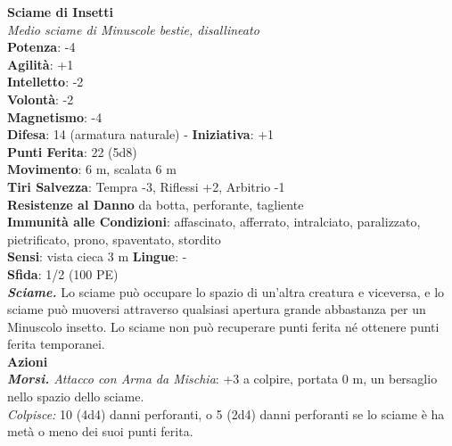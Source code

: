 \begin{multicols}{2}
\medskip\textbf{Sciame di Insetti}\\
\emph{Medio sciame di Minuscole bestie, disallineato}\\
\textbf{Potenza}: -4\\
\textbf{Agilità}: +1\\
\textbf{Intelletto}: -2\\
\textbf{Volontà}: -2\\
\textbf{Magnetismo}: -4\\
\textbf{Difesa}: 14 (armatura naturale) - \textbf{Iniziativa}: +1\\
\textbf{Punti Ferita}: 22 (5d8)\\
\textbf{Movimento}: 6 m, scalata 6 m\\
\textbf{Tiri Salvezza}: Tempra -3, Riflessi +2, Arbitrio -1\\
\textbf{Resistenze al Danno} da botta, perforante, tagliente\\
\textbf{Immunità alle Condizioni}: affascinato, afferrato, intralciato, paralizzato, pietrificato, prono, spaventato, stordito\\
\textbf{Sensi}: vista cieca 3 m
\textbf{Lingue}: -\\
\textbf{Sfida}: 1/2 (100 PE)\smallskip\\
\emph{\textbf{Sciame.}} Lo sciame può occupare lo spazio di un'altra creatura e viceversa, e lo sciame può muoversi attraverso qualsiasi apertura grande abbastanza per un Minuscolo insetto. Lo sciame non può recuperare punti ferita né ottenere punti ferita temporanei.\\
\smallskip\textbf{Azioni}\\
\emph{\textbf{Morsi.} Attacco con Arma da Mischia}: +3 a colpire, portata 0 m, un bersaglio nello spazio dello sciame.\\
\emph{Colpisce:} 10 (4d4) danni perforanti, o 5 (2d4) danni perforanti se lo sciame è ha metà o meno dei suoi punti ferita.\\


\end{multicols}
